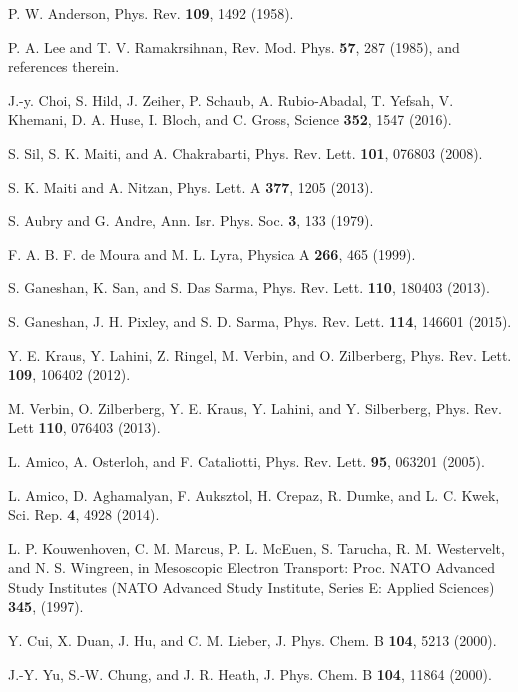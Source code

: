 \documentclass[prb,aps,twocolumn,amsmath,amssymb,floatfix,
superscriptaddress]{revtex4}
\begin{document}
\begin{thebibliography}{99}

 P. W. Anderson, Phys. Rev. \textbf{109}, 1492 (1958).

 P. A. Lee and T. V. Ramakrsihnan, Rev. Mod. Phys.
\textbf{57}, 287 (1985), and references therein.

 J.-y. Choi, S. Hild, J. Zeiher, P. Schaub, A. Rubio-Abadal,
T. Yefsah, V. Khemani, D. A. Huse, I. Bloch, and C. Gross, Science
\textbf{352}, 1547 (2016).

 S. Sil, S. K. Maiti, and A. Chakrabarti, Phys. Rev. Lett.
\textbf{101}, 076803 (2008).

 S. K. Maiti and A. Nitzan, Phys. Lett. A \textbf{377}, 1205 (2013).

 S. Aubry and G. Andre, Ann. Isr. Phys. Soc. \textbf{3},
133 (1979).

 F. A. B. F. de Moura and M. L. Lyra, Physica A \textbf{266},
465 (1999).

 S. Ganeshan, K. San, and S. Das Sarma, Phys. Rev. Lett.
\textbf{110}, 180403 (2013).

 S. Ganeshan, J. H. Pixley, and S. D. Sarma, Phys. Rev. Lett.
\textbf{114}, 146601 (2015).

 Y. E. Kraus, Y. Lahini, Z. Ringel, M. Verbin, and
O. Zilberberg, Phys. Rev. Lett. \textbf{109}, 106402 (2012).

 M. Verbin, O. Zilberberg, Y. E. Kraus, Y. Lahini, and
Y. Silberberg, Phys. Rev. Lett \textbf{110}, 076403 (2013).

 L. Amico, A. Osterloh, and F. Cataliotti, Phys. Rev. Lett.
\textbf{95}, 063201 (2005).

 L. Amico, D. Aghamalyan, F. Auksztol, H. Crepaz, R. Dumke,
and L. C. Kwek, Sci. Rep. \textbf{4}, 4928 (2014).

 L. P. Kouwenhoven, C. M. Marcus, P. L. McEuen, S. Tarucha,
R. M. Westervelt, and N. S. Wingreen, in Mesoscopic Electron Transport:
Proc. NATO Advanced Study Institutes (NATO Advanced Study Institute,
Series E: Applied Sciences) \textbf{345}, (1997).

 Y. Cui, X. Duan, J. Hu, and C. M. Lieber, J. Phys. Chem. B
\textbf{104}, 5213 (2000).

 J.-Y. Yu, S.-W. Chung, and J. R. Heath, J. Phys. Chem. B
\textbf{104}, 11864 (2000).


\end{thebibliography}
\end{document}
